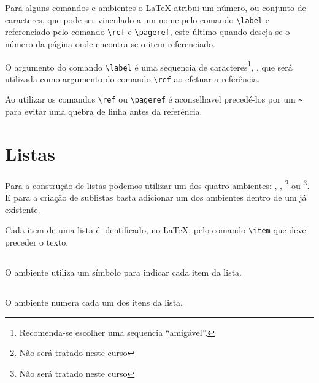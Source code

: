 Para alguns comandos e ambientes o LaTeX atribui um número, ou conjunto de caracteres, que pode ser vinculado a um nome pelo comando \lstinline!\label! e referenciado pelo comando \lstinline!\ref! e \lstinline!\pageref!, este \'{u}ltimo quando deseja-se o n\'{u}mero da página onde encontra-se o item referenciado.

O argumento do comando \lstinline!\label! é uma sequencia de caracteres\footnote{Recomenda-se escolher uma sequencia ``amigável''.}, , que será utilizada como argumento do comando \lstinline!\ref! ao efetuar a referência.

Ao utilizar os comandos \lstinline!\ref! ou \lstinline!\pageref! é aconselhavel precedé-los por um \lstinline!~! para evitar uma quebra de linha antes da refer\^{e}ncia.

\section{Listas}
Para a construção de listas podemos utilizar um dos quatro ambientes: , , \footnote{N\~{a}o ser\'{a} tratado neste curso} ou \footnote{N\~{a}o ser\'{a} tratado neste curso}. E para a criação de sublistas basta adicionar um dos ambientes dentro de um já existente.

Cada item de uma lista é identificado, no LaTeX, pelo comando \lstinline!\item! que deve preceder o texto.

\subsection{}
O ambiente  utiliza um símbolo para indicar cada item da lista. \\

\subsection{}
O ambiente  numera cada um dos itens da lista. \\


